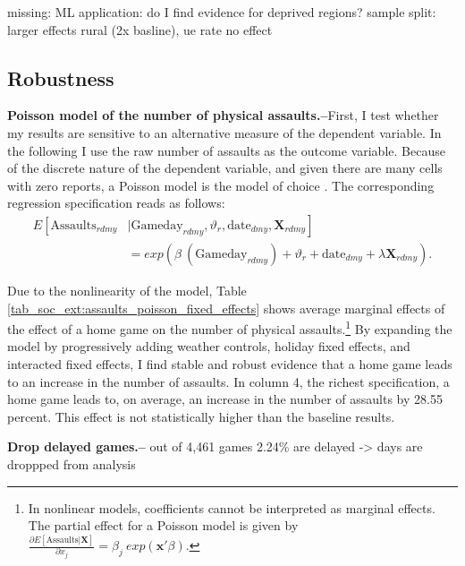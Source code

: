 \documentclass[11pt, a4paper]{article} %
\begin{document}
{\color{red} missing: ML application: do I find evidence for deprived regions?}\newline
sample split: larger effects rural (2x basline), ue rate no effect 










\subsection{Robustness}
\textbf{Poisson model of the number of physical assaults.--}First, I test whether my results are sensitive to an alternative measure of the dependent variable. In the following I use the raw number of assaults as the outcome variable. Because of the discrete nature of the dependent variable, and given there are many cells with zero reports, a Poisson model is the model of choice \citep{lindo2018college}. The corresponding regression specification reads as follows:
\begin{align}
E\left[ \text{Assaults}_{rdmy}\right.&|\left.\text{Gameday}_{rdmy},\vartheta_r,\text{date}_{dmy}, \mathbf{X}_{rdmy}  \right] \nonumber \\ &=  exp\left( \beta\ (\text{Gameday}_{rdmy}) + \vartheta_r + \text{date}_{dmy} + \lambda\mathbf{X}_{rdmy} \right). 
\label{eq_soc_ext:poisson_model}
\end{align}

Due to the nonlinearity of the model, Table \ref{tab_soc_ext:assaults_poisson_fixed_effects} shows average marginal effects of the effect of a home game on the number of physical assaults.\footnote{In nonlinear models, coefficients cannot be interpreted as marginal effects. The partial effect for a Poisson model is given by $\frac{\partial E\left[ \text{Assaults}| \mathbf{X}\right]}{\partial x_j} = \beta_j\ exp(\mathbf{x'}\beta)$.} By expanding the model by progressively adding weather controls, holiday fixed effects, and interacted fixed effects, I find stable and robust evidence that a home game leads to an increase in the number of assaults. In column 4, the richest specification, a home game leads to, on average, an increase in the number of assaults by 28.55 percent. This effect is not statistically higher than the baseline results. 


\bigskip
\textbf{Drop delayed games.--} out of 4,461 games 2.24\% are delayed -> days are droppped from analysis
\end{document}
